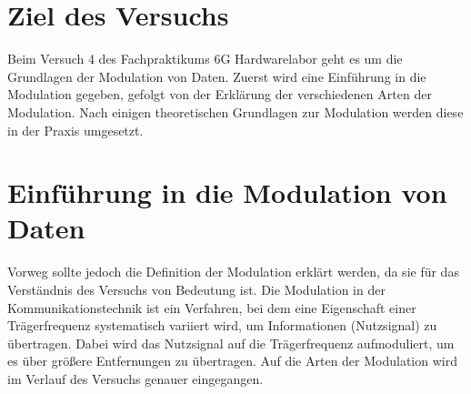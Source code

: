     \section{Ziel des Versuchs}
    Beim Versuch 4 des Fachpraktikums 6G Hardwarelabor geht es um die Grundlagen der Modulation von Daten.
    Zuerst wird eine Einführung in die Modulation gegeben, gefolgt von der Erklärung der verschiedenen Arten der Modulation. Nach einigen theoretischen Grundlagen zur Modulation werden diese in der Praxis umgesetzt.

    \section{Einführung in die Modulation von Daten}
    Vorweg sollte jedoch die Definition der Modulation erklärt werden, da sie für das Verständnis des Versuchs von Bedeutung ist.
    Die Modulation in der Kommunikationstechnik ist ein Verfahren, bei dem eine Eigenschaft einer Trägerfrequenz systematisch variiert wird, um Informationen (Nutzsignal) zu übertragen.
    Dabei wird das Nutzsignal auf die Trägerfrequenz aufmoduliert, um es über größere Entfernungen zu übertragen.
    Auf die Arten der Modulation wird im Verlauf des Versuchs genauer eingegangen.
\clearpage